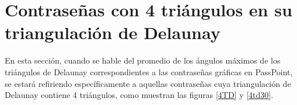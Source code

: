 \documentclass[12pt]{report}
\begin{document}
\section{Contraseñas con 4 triángulos en su triangulación de Delaunay }
\label{sec:2}
En esta sección, cuando se hable del promedio de los ángulos máximos de los triángulos de Delaunay correspondientes a las contraseñas gráficas en PassPoint, se estará refiriendo específicamente a aquellas contraseñas cuya triangulación de Delaunay contiene 4 triángulos, como muestran las figuras \ref{4TD} y \ref{4td30}.

%	
\end{document}
